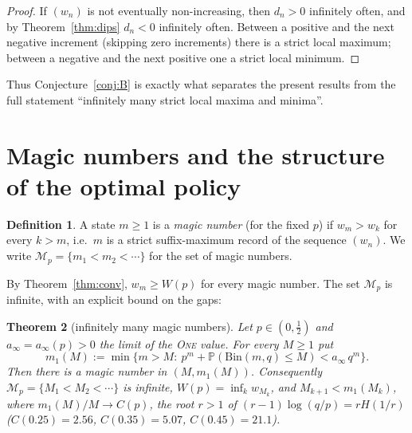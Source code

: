 \documentclass[11pt]{article}
\newtheorem{theorem}{Theorem}[section]
\theoremstyle{definition}
\newtheorem{definition}[theorem]{Definition}
\newcommand{\One}{\textsc{One}}
\newcommand{\Bin}{\mathrm{Bin}}
\newcommand{\Prob}{\mathbb{P}}
\begin{document}
\begin{proof}
  If $(w_n)$ is not eventually non-increasing, then $d_n>0$ infinitely
  often, and by Theorem~\ref{thm:dips} $d_n<0$ infinitely often.
  Between a positive and the next negative increment (skipping zero
  increments) there is a strict local maximum; between a negative and
  the next positive one a strict local minimum.
\end{proof}

Thus Conjecture~\ref{conj:B} is exactly what separates the present
results from the full statement ``infinitely many strict local maxima
and minima''.

\section{Magic numbers and the structure of the optimal
  policy}\label{sec:magic}

\begin{definition}\label{def:magic}
  A state $m\ge1$ is a \emph{magic number} (for the fixed $p$) if
  $w_m>w_k$ for every $k>m$, i.e.\ $m$ is a strict suffix-maximum
  record of the sequence $(w_n)$.  We write
  $\mathcal M_p=\{m_1<m_2<\cdots\}$ for the set of magic numbers.
\end{definition}

By Theorem~\ref{thm:conv}, $w_m\ge W(p)$ for every magic number.  The
set $\mathcal M_p$ is infinite, with an explicit bound on the gaps:

\begin{theorem}[infinitely many magic numbers]\label{thm:magic-inf}
  Let $p\in(0,\tfrac12)$ and $a_\infty=a_\infty(p)>0$ the limit of the
  \One{} value.  For every $M\ge1$ put
  \[
    m_1(M):=\min\bigl\{m>M:\ p^{m}+\Prob(\Bin(m,q)\le M)<a_\infty\,q^{m}\bigr\}.
  \]
  Then there is a magic number in $(M,m_1(M))$.  Consequently
  $\mathcal M_p=\{M_1<M_2<\cdots\}$ is infinite,
  $W(p)=\inf_kw_{M_k}$, and $M_{k+1}<m_1(M_k)$, where
  $m_1(M)/M\to C(p)$, the root $r>1$ of $(r-1)\log(q/p)=rH(1/r)$
  ($C(0.25)=2.56$, $C(0.35)=5.07$, $C(0.45)=21.1$).
\end{theorem}
\end{document}
